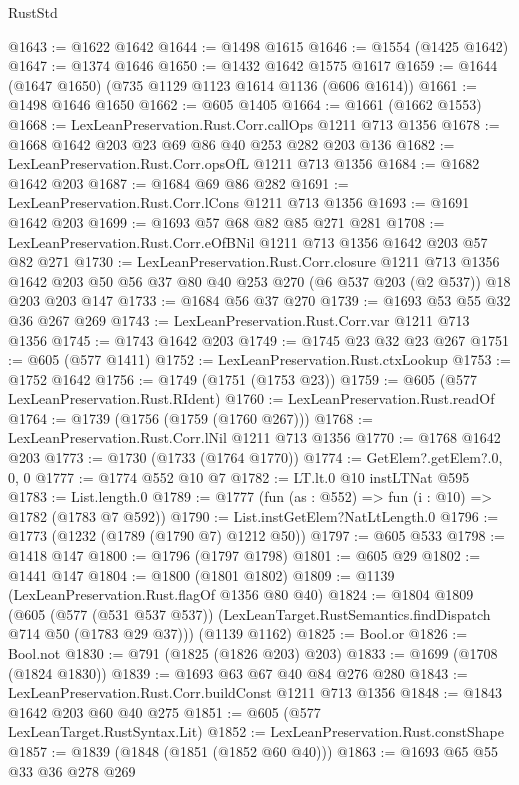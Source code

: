 \begin{lexlean}{RustStd}
\begin{coremodule}
@1643 := @1622 @1642
@1644 := @1498 @1615
@1646 := @1554 (@1425 @1642)
@1647 := @1374 @1646
@1650 := @1432 @1642 @1575 @1617
@1659 := @1644 (@1647 @1650) (@735 @1129 @1123 @1614 @1136 (@606 @1614))
@1661 := @1498 @1646 @1650
@1662 := @605 @1405
@1664 := @1661 (@1662 @1553)
@1668 := LexLeanPreservation.Rust.Corr.callOps @1211 @713 @1356
@1678 := @1668 @1642 @203 @23 @69 @86 @40 @253 @282 @203 @136
@1682 := LexLeanPreservation.Rust.Corr.opsOfL @1211 @713 @1356
@1684 := @1682 @1642 @203
@1687 := @1684 @69 @86 @282
@1691 := LexLeanPreservation.Rust.Corr.lCons @1211 @713 @1356
@1693 := @1691 @1642 @203
@1699 := @1693 @57 @68 @82 @85 @271 @281
@1708 := LexLeanPreservation.Rust.Corr.eOfBNil @1211 @713 @1356 @1642 @203 @57 @82 @271
@1730 := LexLeanPreservation.Rust.Corr.closure
    @1211
    @713
    @1356
    @1642
    @203
    @50
    @56
    @37
    @80
    @40
    @253
    @270
    (@6 @537 @203 (@2 @537))
    @18
    @203
    @203
    @147
@1733 := @1684 @56 @37 @270
@1739 := @1693 @53 @55 @32 @36 @267 @269
@1743 := LexLeanPreservation.Rust.Corr.var @1211 @713 @1356
@1745 := @1743 @1642 @203
@1749 := @1745 @23 @32 @23 @267
@1751 := @605 (@577 @1411)
@1752 := LexLeanPreservation.Rust.ctxLookup
@1753 := @1752 @1642
@1756 := @1749 (@1751 (@1753 @23))
@1759 := @605 (@577 LexLeanPreservation.Rust.RIdent)
@1760 := LexLeanPreservation.Rust.readOf
@1764 := @1739 (@1756 (@1759 (@1760 @267)))
@1768 := LexLeanPreservation.Rust.Corr.lNil @1211 @713 @1356
@1770 := @1768 @1642 @203
@1773 := @1730 (@1733 (@1764 @1770))
@1774 := GetElem?.getElem?.{0, 0, 0}
@1777 := @1774 @552 @10 @7
@1782 := LT.lt.{0} @10 instLTNat @595
@1783 := List.length.{0}
@1789 := @1777 (fun (as : @552) => fun (i : @10) => @1782 (@1783 @7 @592))
@1790 := List.instGetElem?NatLtLength.{0}
@1796 := @1773 (@1232 (@1789 (@1790 @7) @1212 @50))
@1797 := @605 @533
@1798 := @1418 @147
@1800 := @1796 (@1797 @1798)
@1801 := @605 @29
@1802 := @1441 @147
@1804 := @1800 (@1801 @1802)
@1809 := @1139 (LexLeanPreservation.Rust.flagOf @1356 @80 @40)
@1824 := @1804
    @1809
    (@605
      (@577 (@531 @537 @537))
      (LexLeanTarget.RustSemantics.findDispatch @714 @50 (@1783 @29 @37)))
    (@1139 @1162)
@1825 := Bool.or
@1826 := Bool.not
@1830 := @791 (@1825 (@1826 @203) @203)
@1833 := @1699 (@1708 (@1824 @1830))
@1839 := @1693 @63 @67 @40 @84 @276 @280
@1843 := LexLeanPreservation.Rust.Corr.buildConst @1211 @713 @1356
@1848 := @1843 @1642 @203 @60 @40 @275
@1851 := @605 (@577 LexLeanTarget.RustSyntax.Lit)
@1852 := LexLeanPreservation.Rust.constShape
@1857 := @1839 (@1848 (@1851 (@1852 @60 @40)))
@1863 := @1693 @65 @55 @33 @36 @278 @269

\end{coremodule}
\end{lexlean}
